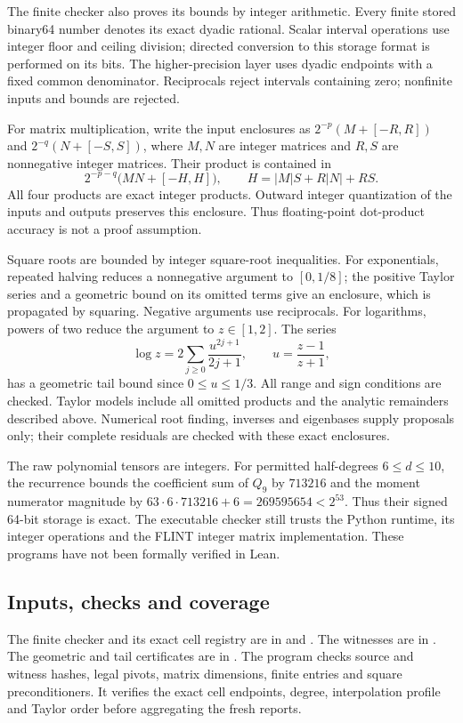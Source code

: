 \documentclass[12pt,reqno]{amsart}
\theoremstyle{definition}
\numberwithin{equation}{section}
\begin{document}
The finite checker also proves its bounds by integer arithmetic.
Every finite stored binary64 number denotes its exact dyadic rational.
Scalar interval operations use integer floor and ceiling division;
directed conversion to this storage format is performed on its bits.
The higher-precision layer uses dyadic endpoints with a fixed common
denominator. Reciprocals reject intervals containing zero; nonfinite
inputs and bounds are rejected.

For matrix multiplication, write the input enclosures as
$2^{-p}(M+[-R,R])$ and $2^{-q}(N+[-S,S])$, where $M,N$ are integer
matrices and $R,S$ are nonnegative integer matrices. Their product is
contained in
\[
 2^{-p-q}\bigl(MN+[-H,H]\bigr),\qquad
 H=|M|S+R|N|+RS.
\]
All four products are exact integer products. Outward integer
quantization of the inputs and outputs preserves this enclosure.
Thus floating-point dot-product accuracy is not a proof assumption.

Square roots are bounded by integer square-root inequalities.
For exponentials, repeated halving reduces a nonnegative argument to
$[0,1/8]$; the positive Taylor series and a geometric bound on its
omitted terms give an enclosure, which is propagated by squaring.
Negative arguments use reciprocals. For logarithms, powers of two
reduce the argument to $z\in[1,2]$. The series
\[
 \log z=2\sum_{j\ge0}\frac{u^{2j+1}}{2j+1},
 \qquad u=\frac{z-1}{z+1},
\]
has a geometric tail bound since $0\le u\le1/3$.
All range and sign conditions are checked. Taylor models include all
omitted products and the analytic remainders described above.
Numerical root finding, inverses and eigenbases supply proposals only;
their complete residuals are checked with these exact enclosures.

The raw polynomial tensors are integers. For permitted half-degrees
$6\le d\le10$, the recurrence bounds the coefficient sum of $Q_9$
by $713216$ and the moment numerator magnitude by
$63\cdot6\cdot713216+6=269595654<2^{53}$.
Thus their signed 64-bit storage is exact. The executable checker
still trusts the Python runtime, its integer operations and the FLINT
integer matrix implementation. These programs have not been formally
verified in Lean.

\subsection{Inputs, checks and coverage}
The finite checker and its exact cell registry are in
 and . The witnesses are
in . The geometric and tail
certificates are in .
The program  checks source and witness hashes,
legal pivots, matrix dimensions, finite entries and square preconditioners.
It verifies the exact cell endpoints, degree, interpolation profile
and Taylor order before aggregating the fresh reports.
\end{document}
